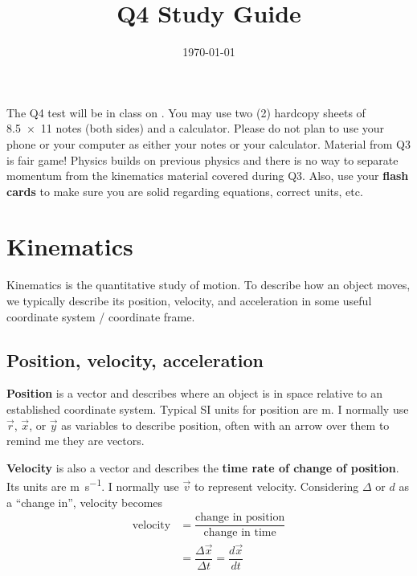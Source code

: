 \documentclass [handout]{tufte-handout}
\title{Q4 Study Guide}
\author{\mobeardInstructorShort}
\date{\today}
\begin{document}
\maketitle
The Q4 test will be in class on . You may use two (2) hardcopy sheets of \SI{8.5x11}{\inch} notes (both sides) and a calculator. Please do not plan to use your phone or your computer as either your notes or your calculator.   Material from Q3 is fair game! Physics builds on previous physics and there is no way to separate momentum from the kinematics material covered during Q3. Also, use your \textbf{flash cards} to make sure you are solid regarding equations, correct units, etc. 

\section{Kinematics}
Kinematics is the quantitative study of motion. To describe how an object moves, we typically describe its position, velocity, and acceleration in some useful coordinate system / coordinate frame. 
\subsection{Position, velocity, acceleration}
\textbf{Position} is a vector and describes where an object is in space relative to an established coordinate system. Typical SI units for position are \si{\meter}. I normally use $\vec{r}$, $\vec{x}$, or $\vec{y}$ as variables to describe position, often with an arrow over them to remind me they are vectors. 

\textbf{Velocity} is also a vector and describes the \textbf{time rate of change of position}. Its units are \si{\meter\per\second}. I normally use $\vec{v}$ to represent velocity. Considering $\Delta$ or $d$ as a ``change in'', velocity becomes
\begin{align}
\text{velocity} &= \dfrac{\text{change in position}}{\text{change in time}} \\
&= \dfrac{\Delta \vec{x}}{\Delta t} = \dfrac{d\vec{x}}{dt} 
\end{align}
\end{document}
